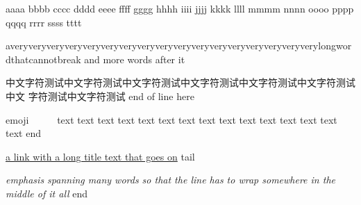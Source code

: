 aaaa bbbb cccc dddd eeee ffff gggg hhhh iiii jjjj kkkk llll mmmm nnnn
oooo pppp qqqq rrrr ssss tttt

averyveryveryveryveryveryveryveryveryveryveryveryveryveryveryveryverylongwordthatcannotbreak
and more words after it

中文字符测试中文字符测试中文字符测试中文字符测试中文字符测试中文字符测试中文
字符测试中文字符测试 end of line here

emoji 👍🏽👍🏽👍🏽👍🏽 text text text text text text text text text text text
text text text text end

\href{https://example.com/a/very/long/path/that/is/long}{a link with a
long title text that goes on} tail

\emph{emphasis spanning many words so that the line has to wrap
somewhere in the middle of it all} end
